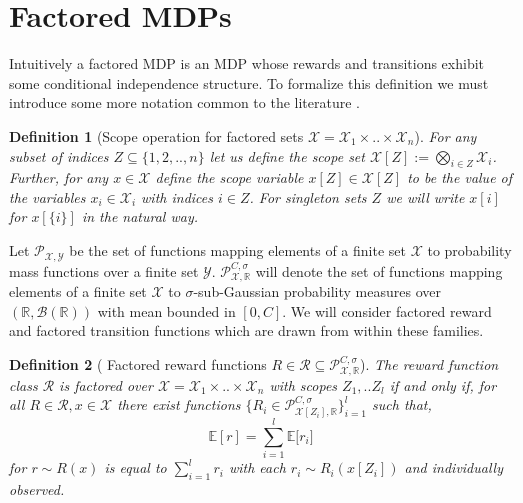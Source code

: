 \documentclass{article}
\newtheorem{mydef}{Definition}
\newcommand{\Exp}{\mathds{E}}
\newcommand{\Real}{\mathds{R}}
\newcommand{\Xc}{\mathcal{X}}
\newcommand{\Yc}{\mathcal{Y}}
\newcommand{\Pc}{\mathcal{P}}
\newcommand{\Rc}{\mathcal{R}}
\begin{document}
\section{Factored MDPs}

Intuitively a factored MDP is an MDP whose rewards and transitions exhibit some conditional independence structure.
To formalize this definition we must introduce some more notation common to the literature \cite{szita2009optimistic}.

\begin{mydef}[Scope operation for factored sets $\Xc = \Xc_1 \times .. \times \Xc_n$]
\hspace{0.000000001mm} \newline
For any subset of indices $Z \subseteq \{1,2,..,n\}$ let us define the scope set $\Xc[Z] := \bigotimes\limits_{i \in Z} \Xc_i$.
Further, for any $x \in \Xc$ define the scope variable $x[Z] \in \Xc[Z] $ to be the value of the variables $x_i \in \Xc_i$ with indices $i \in Z$.
For singleton sets $Z$ we will write $x[i]$ for $x[\{ i \}]$ in the natural way.
\end{mydef}


Let $\Pc_{\Xc,\Yc}$ be the set of functions mapping elements of a finite set $\Xc$ to probability mass functions over a finite set $\Yc$.
$\Pc^{C,\sigma}_{\Xc,\Real}$ will denote the set of functions mapping elements of a finite set $\Xc$ to $\sigma$-sub-Gaussian probability measures over $(\Real, \mathcal{B}(\Real))$ with mean bounded in $[0,C]$.
We will consider factored reward and factored transition functions which are drawn from within these families.

\begin{mydef}[ Factored reward functions $R \in \Rc \subseteq \Pc^{C,\sigma}_{\Xc,\Real} $]
\hspace{0.000000001mm} \newline
The reward function class $\Rc$ is factored over $\Xc = \Xc_1 \times .. \times \Xc_n $ with scopes $Z_1, .. Z_l$ if and only if,
for all $R \in \Rc, x \in \Xc$ there exist functions $\{R_i \in \Pc^{C,\sigma}_{\Xc [ Z_i] ,\Real} \}_{i=1}^l $ such that,
$$ \Exp [ r ] = \sum_{i=1}^l \Exp\big[ r_i \big] $$
for $r \sim R(x)$ is equal to $\sum_{i=1}^l r_i$ with each $r_i \sim R_i(x[Z_i])$ and individually observed.
\end{mydef}
\end{document}
